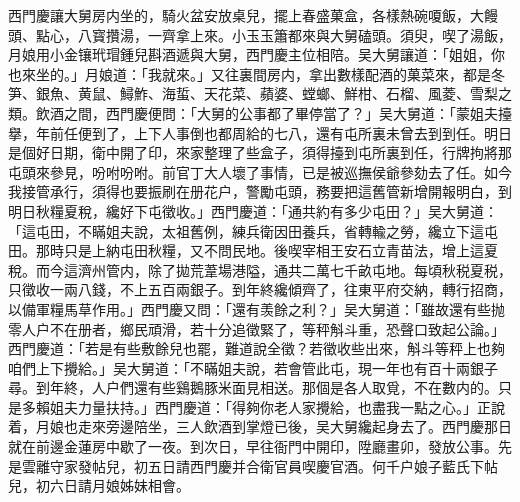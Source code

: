 西門慶讓大舅房内坐的，騎火盆安放桌兒，擺上春盛菓盒，各樣熱碗嗄飯，大饅頭、點心，八寳攢湯，一齊拿上來。小玉玉簫都來與大舅磕頭。須臾，喫了湯飯，月娘用小金镶玳瑁鍾兒斟酒遞與大舅，西門慶主位相陪。吴大舅讓道：「姐姐，你也來坐的。」月娘道：「我就來。」又往裏間房内，拿出數樣配酒的菓菜來，都是冬笋、銀魚、黄鼠、鱘鮓、海蜇、天花菜、蘋婆、螳螂、鮮柑、石榴、風菱、雪梨之類。飲酒之間，西門慶便問：「大舅的公事都了畢停當了？」吴大舅道：「蒙姐夫擡擧，年前任便到了，上下人事倒也都周給的七八，還有屯所裏未曾去到到任。明日是個好日期，衛中開了印，來家整理了些盒子，須得擡到屯所裏到任，行牌拘將那屯頭來參見，吩咐吩咐。前官丁大人壞了事情，已是被巡撫侯爺參劾去了任。如今我接管承行，須得也要振刷在册花户，警勵屯頭，務要把這舊管新增開報明白，到明日秋糧夏稅，纔好下屯徵收。」西門慶道：「通共約有多少屯田？」吴大舅道：「這屯田，不瞞姐夫說，太祖舊例，練兵衛因田養兵，省轉輸之勞，纔立下這屯田。那時只是上納屯田秋糧，又不問民地。後喫宰相王安石立青苗法，增上這夏稅。而今這濟州管内，除了拋荒葦場港隘，通共二萬七千畝屯地。每頃秋税夏税，只徵收一兩八錢，不上五百兩銀子。到年終纔傾齊了，往東平府交納，轉行招商，以備軍糧馬草作用。」西門慶又問：「還有羡餘之利？」吴大舅道：「雖故還有些抛零人户不在册者，鄉民頑滑，若十分追徵緊了，等秤斛斗重，恐聲口致起公論。」西門慶道：「若是有些敷餘兒也罷，難道說全徵？若徵收些出來，斛斗等秤上也夠咱們上下攪給。」吴大舅道：「不瞞姐夫說，若會管此屯，現一年也有百十兩銀子尋。到年終，人户們還有些鷄鵝豚米面見相送。那個是各人取覓，不在數内的。只是多賴姐夫力量扶持。」西門慶道：「得夠你老人家攪給，也盡我一點之心。」正說着，月娘也走來旁邊陪坐，三人飲酒到掌燈已後，吴大舅纔起身去了。西門慶那日就在前邊金蓮房中歇了一夜。到次日，早往衙門中開印，陞廳畫卯，發放公事。先是雲離守家發帖兒，初五日請西門慶并合衛官員喫慶官酒。何千户娘子藍氏下帖兒，初六日請月娘姊妹相會。

